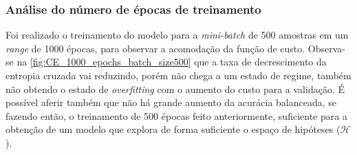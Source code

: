 \clearpage

\subsubsection*{Análise do número de épocas de treinamento}

Foi realizado o treinamento do modelo para a \textit{mini-batch} de 500 amostras em um \textit{range} de 1000 épocas, para observar a acomodação da função de custo. Observa-se na \autoref{fig:CE_1000_epochs_batch_size500} que a taxa de decrescimento da entropia cruzada vai reduzindo, porém não chega a um estado de regime, também não obtendo o estado de \textit{overfitting} com o aumento do custo para a validação. É possível aferir também que não há grande aumento da acurácia balanceada, se fazendo então, o treinamento de 500 épocas feito anteriormente, suficiente para a obtenção de um modelo que explora de forma suficiente o espaço de hipóteses ($\mathcal{H}$).

